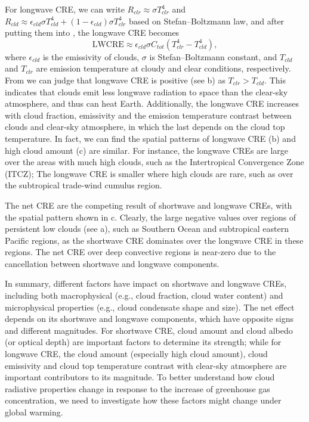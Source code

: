 For longwave CRE, we can write $R_{clr}\approx \sigma T_{clr}^4$ and $R_{cld}\approx \epsilon_{cld}\sigma T_{cld}^4 +  (1-\epsilon_{cld}) \sigma T_{clr}^4$ based on Stefan--Boltzmann law, and after putting them into , the longwave CRE becomes
\begin{equation}
    \mathrm{LWCRE} \approx \epsilon_{cld} \sigma C_{tot}\left(T_{clr}^4-T_{cld}^4\right),
    \label{eq:lwcre2}
\end{equation}
where $\epsilon_{cld}$ is the emissivity of clouds, $\sigma$ is Stefan--Boltzmann constant, and $T_{cld}$ and $T_{clr}$ are emission temperature at cloudy and clear conditions, respectively. From  we can judge that longwave CRE is positive  (see b) as $T_{clr}>T_{cld}$. This indicates that clouds emit less longwave radiation to space than the clear-sky atmosphere, and thus can heat Earth. Additionally, the longwave CRE increases with cloud fraction, emissivity and the emission temperature contrast between clouds and clear-sky atmosphere, in which the last depends on the cloud top temperature. In fact, we can find the spatial patterns of longwave CRE (b) and high cloud amount (c) are similar. For instance, the longwave CREs are large over the areas with much high clouds, such as the Intertropical Convergence Zone (ITCZ); The longwave CRE is smaller where high clouds are rare, such as over the subtropical trade-wind cumulus region.

The net CRE are the competing result of shortwave and longwave CREs, with the spatial pattern shown in c. Clearly, the large negative values over regions of persistent low clouds (see a), such as Southern Ocean and subtropical eastern Pacific regions, as the shortwave CRE dominates over the longwave CRE in these regions. The net CRE over deep convective regions is near-zero due to the cancellation between shortwave and longwave components.

In summary, different factors have impact on shortwave and longwave CREs, including both macrophysical (e.g., cloud fraction, cloud water content) and microphysical properties (e.g., cloud condensate shape and size). The net effect depends on its shortwave and longwave components, which have opposite signs and different magnitudes. For shortwave CRE, cloud amount and cloud albedo (or optical depth) are important factors to determine its strength; while for longwave CRE, the cloud amount (especially high cloud amount), cloud emissivity and cloud top temperature contrast with clear-sky atmosphere are important contributors to its magnitude. To better understand how cloud radiative properties change in response to the increase of greenhouse gas concentration, we need to investigate how these factors might change under global warming.


